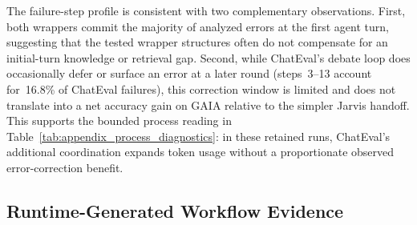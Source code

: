 \begin{table}[t]
\centering
\caption{Failure-step distribution from binary-search attribution on retained GAIA failed instances (GPT-4.1 backbone). Step index is the earliest conversation turn at which the agent output diverges from the ground truth. Jarvis (88 analyzed instances) commits errors overwhelmingly at step~1, consistent with its single-shot handoff. ChatEval (101 analyzed instances) also concentrates errors at step~1, showing that the debate loop does not reliably rescue initial-turn failures; a smaller fraction persists or is first introduced at later odd-numbered debate rounds.}
\label{tab:appendix_failure_step_distribution}
\small
\setlength{\tabcolsep}{5pt}
\renewcommand{\arraystretch}{1.12}
\end{table}

The failure-step profile is consistent with two complementary observations. First, both wrappers commit the majority of analyzed errors at the first agent turn, suggesting that the tested wrapper structures often do not compensate for an initial-turn knowledge or retrieval gap. Second, while ChatEval's debate loop does occasionally defer or surface an error at a later round (steps~3--13 account for~16.8\% of ChatEval failures), this correction window is limited and does not translate into a net accuracy gain on GAIA relative to the simpler Jarvis handoff. This supports the bounded process reading in Table~\ref{tab:appendix_process_diagnostics}: in these retained runs, ChatEval's additional coordination expands token usage without a proportionate observed error-correction benefit.

\subsection{Runtime-Generated Workflow Evidence}
\label{subsec:appendix_runtime_evidence}

